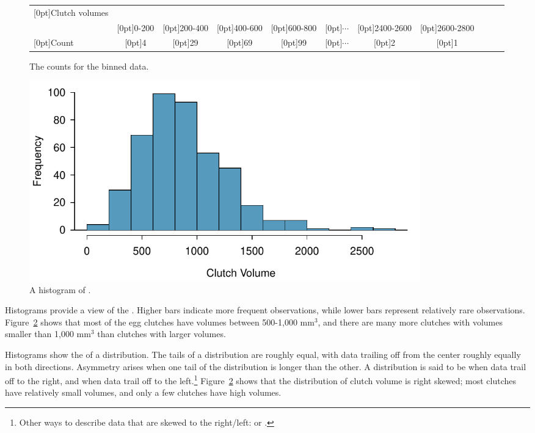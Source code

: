 \begin{figure}[ht]
	\centering\small
	\begin{tabular}{l ccc ccc ccc c}
		\hline
		\raisebox{-1.5ex}[0pt]{Clutch volumes} & \\
		& \raisebox{1.5ex}[0pt]{0-200} & \raisebox{1.5ex}[0pt]{200-400} & \raisebox{1.5ex}[0pt]{400-600} & \raisebox{1.5ex}[0pt]{600-800} & \raisebox{1.5ex}[0pt]{$\cdots$} & \raisebox{1.5ex}[0pt]{2400-2600} & \raisebox{1.5ex}[0pt]{2600-2800} \\
		\hline
		\raisebox{-.25ex}[0pt]{Count} & \raisebox{-.25ex}[0pt]{4} & \raisebox{-.25ex}[0pt]{29} & \raisebox{-.25ex}[0pt]{69} & \raisebox{-.25ex}[0pt]{99} & \raisebox{-.25ex}[0pt]{$\cdots$} & \raisebox{-.25ex}[0pt]{2} & \raisebox{-.25ex}[0pt]{1} \\
		\hline
	\end{tabular}
	\caption{The counts for the binned  data.}
	\label{frogBinnedClutchVolTable}
\end{figure}

\begin{figure}[ht]
	\centering
	\includegraphics[width=0.82\textwidth]{ch_intro_to_data_oi_biostat/figures/frogHist/frogHist}
	\caption{A histogram of .}
	\label{frogHist}
\end{figure}

Histograms provide a view of the . Higher bars indicate more frequent observations, while lower bars represent relatively rare observations. Figure~\ref{frogHist} shows that most of the egg clutches have volumes between 500-1,000 mm$^3$, and there are many more clutches with volumes smaller than 1,000 mm$^{3}$ than clutches with larger volumes. 

Histograms show the  of a distribution\label{shapeFirstDiscussed}. The tails of a  distribution are roughly equal, with data trailing off from the center roughly equally in both directions. Asymmetry arises when one tail of the distribution is longer than the other. A distribution is said to be  when data trail off to the right, and  when data trail off to the left.\footnote{Other ways to describe data that are skewed to the right/left:  or .} Figure~\ref{frogHist} shows that the distribution of clutch volume is right skewed; most clutches have relatively small volumes, and only a few clutches have high volumes. 

